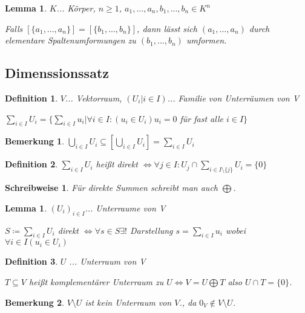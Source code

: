 \documentclass[twocolumn]{article}
\newtheorem{lemma}[theorem]{Lemma}
\newtheorem{definition}{Definition}[section]
\newtheorem*{remark}{Bemerkung}
\newtheorem*{schreibweise}{Schreibweise}
\newcommand*{\logeq}{\Leftrightarrow}
\begin{document}
\begin{lemma}
	$K$... Körper, $n\geq 1$, $a_1,...,a_n,b_1,...,b_n \in K^n$
	
	Falls $[\{a_1,...,a_n\}] = [\{b_1,...,b_n\}]$, dann lässt sich $(a_1,...,a_n)$ durch elementare Spaltenumformungen zu $(b_1,...,b_n)$ umformen.
\end{lemma}

\subsection{Dimenssionssatz}

\begin{definition}
	$V$... Vektorraum, $(U_i|i \in I)$... Familie von Unterräumen von V
	
	$\sum_{i \in I}U_i=\{\sum_{i \in I}u_i|\forall i\in I: (u_i \in U_i) u_i=0$ für fast alle $i \in I\}$
\end{definition}

\begin{remark}
	$\bigcup_{i\in I}U_i \subseteq [\bigcup_{i\in I}U_i]=\sum_{i \in I}U_i$
\end{remark}

\begin{definition}
	$\sum_{i \in I}U_i$ heißt direkt $\logeq \forall j \in I : U_j \cap \sum_{i \in I \setminus \{j\}}U_i = \{0\}$
\end{definition}

\begin{schreibweise}
	Für direkte Summen schreibt man auch $\bigoplus$.
\end{schreibweise}

\begin{lemma}
	$(U_i)_{i \in I}$... Unterraume von V
	
	$S\coloneqq \sum_{i \in I}U_i$ direkt $\logeq \forall s \in S \exists!$ Darstellung $s=\sum_{i \in I}u_i$ wobei $\forall i \in I(u_i \in U_i)$
\end{lemma}

\begin{definition}
	$U$ ... Unterraum von V
	
	$T \subseteq V$ heißt komplementärer Unterraum zu $U \logeq V = U \bigoplus T$ also $U \cap T = \{0\}$.
\end{definition}

\begin{remark}
	$V\setminus U$ ist kein Unterraum von $V$., da $0_V \notin V \setminus U$.
\end{remark}
\end{document}
